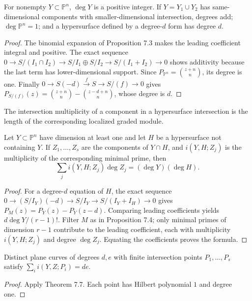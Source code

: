 \begin{proposition}[Degree]
\label{prop:ha-ch1-7-6}
For nonempty $Y\subset\mathbb P^n$, $\deg Y$ is a positive integer.  If $Y=Y_1\cup Y_2$ has
same-dimensional components with smaller-dimensional intersection, degrees add; $\deg\mathbb P^n=1$;
and a hypersurface defined by a degree-$d$ form has degree $d$.
\end{proposition}
\begin{proof}
The binomial expansion of Proposition 7.3 makes the leading coefficient integral and positive.
The exact sequence
\(0\to S/(I_1\cap I_2)\to S/I_1\oplus S/I_2\to S/(I_1+I_2)\to0\)
shows additivity because the last term has lower-dimensional support.  Since
$P_{\mathbb P^n}=\binom{z+n}{n}$, its degree is one.  Finally
$0\to S(-d)\xrightarrow f S\to S/(f)\to0$ gives
$P_{S/(f)}(z)=\binom{z+n}{n}-\binom{z-d+n}{n}$, whose degree is $d$.
\end{proof}

\begin{definition}
\label{def:ha-ch1-intersection-multiplicity}
The intersection multiplicity of a component in a hypersurface intersection is the length of the
corresponding localized graded module.
\end{definition}

\begin{theorem}
\label{thm:ha-ch1-7-7}
Let $Y\subset\mathbb P^n$ have dimension at least one and let $H$ be a hypersurface not containing
$Y$.  If $Z_1,\ldots,Z_s$ are the components of $Y\cap H$, and
$i(Y,H;Z_j)$ is the multiplicity of the corresponding minimal prime, then
\[
\sum_j i(Y,H;Z_j)\deg Z_j=(\deg Y)(\deg H).
\]
\end{theorem}
\begin{proof}
For a degree-$d$ equation of $H$, the exact sequence
$0\to(S/I_Y)(-d)\to S/I_Y\to S/(I_Y+I_H)\to0$ gives
$P_M(z)=P_Y(z)-P_Y(z-d)$.  Comparing leading coefficients yields
$d\deg Y/(r-1)!$.  Filter $M$ as in Proposition 7.4; only minimal primes of dimension $r-1$
contribute to the leading coefficient, each with multiplicity $i(Y,H;Z_j)$ and degree $\deg Z_j$.
Equating the coefficients proves the formula.
\end{proof}

\begin{corollary}[Bezout]
\label{cor:ha-ch1-7-8}
Distinct plane curves of degrees $d,e$ with finite intersection points $P_1,\ldots,P_s$ satisfy
$\sum_i i(Y,Z;P_i)=de$.
\end{corollary}
\begin{proof}
Apply Theorem 7.7.  Each point has Hilbert polynomial $1$ and degree one.
\end{proof}

